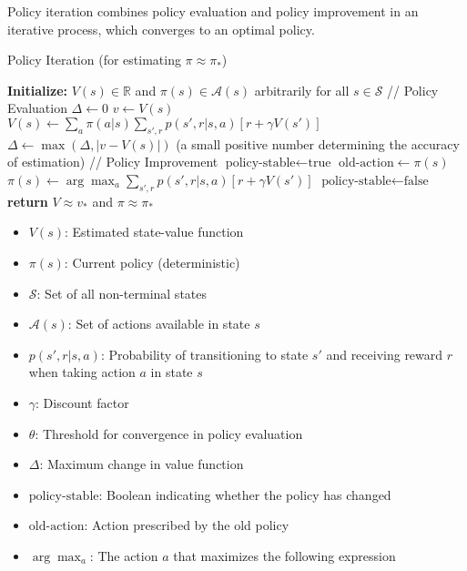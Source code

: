 \documentclass{article}
\begin{document}
Policy iteration combines policy evaluation and policy improvement in an iterative process, which converges to an optimal policy.

\begin{algorithm}
\caption{Policy Iteration (for estimating $\pi \approx \pi_*$)}
\begin{algorithmic}[1]
\State \textbf{Initialize:} $V(s) \in \mathbb{R}$ and $\pi(s) \in \mathcal{A}(s)$ arbitrarily for all $s \in \mathcal{S}$
\Repeat
\State // Policy Evaluation
\Repeat
\State $\Delta \gets 0$
\State $v \gets V(s)$
\State $V(s) \gets \sum_a \pi(a|s) \sum_{s',r} p(s',r|s,a)[r + \gamma V(s')]$
\State $\Delta \gets \max(\Delta, |v - V(s)|)$
\EndFor
\Until{$\Delta < \theta$} (a small positive number determining the accuracy of estimation)
\State // Policy Improvement
\State $\text{policy-stable} \gets \text{true}$
\State $\text{old-action} \gets \pi(s)$
\State $\pi(s) \gets \arg\max_a \sum_{s',r} p(s',r|s,a)[r + \gamma V(s')]$
\State $\text{policy-stable} \gets \text{false}$
\EndIf
\EndFor
{}
\State \textbf{return} $V \approx v_*$ and $\pi \approx \pi_*$
\end{algorithmic}
\end{algorithm}

\begin{tcolorbox}[colframe=blue!50!black, colback=blue!10, title=Notation Overview]
\begin{itemize}
    \item $V(s)$: Estimated state-value function
    \item $\pi(s)$: Current policy (deterministic)
    \item $\mathcal{S}$: Set of all non-terminal states
    \item $\mathcal{A}(s)$: Set of actions available in state $s$
    \item $p(s',r|s,a)$: Probability of transitioning to state $s'$ and receiving reward $r$ when taking action $a$ in state $s$
    \item $\gamma$: Discount factor
    \item $\theta$: Threshold for convergence in policy evaluation
    \item $\Delta$: Maximum change in value function
    \item $\text{policy-stable}$: Boolean indicating whether the policy has changed
    \item $\text{old-action}$: Action prescribed by the old policy
    \item $\arg\max_a$: The action $a$ that maximizes the following expression
\end{itemize}
\end{tcolorbox}
\end{document}
